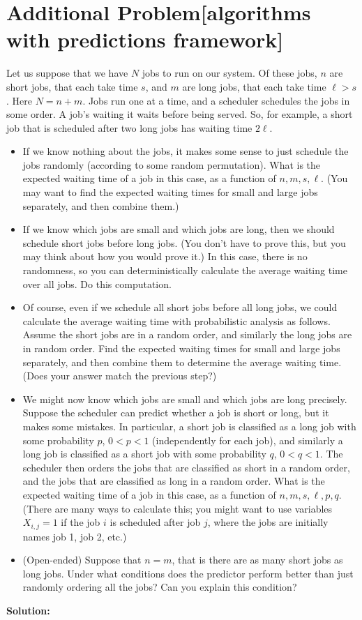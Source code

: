 \documentclass[11pt]{article}
\newenvironment{question}[2]
{\newpage\section{#1\texorpdfstring{\hfill}{horizontal spacing}{\rm\normalsize #2}}}{}
\newenvironment{solution}
{\textbf{Solution: }\color{blue}}
{\color{black}}
\begin{document}
\begin{question}{Additional Problem}{[algorithms with predictions framework]}

Let us suppose that we have \(N\) jobs to run on our system. Of these jobs, \(n\) are short jobs, that each take time \(s\), and \(m\) are long jobs, that each take time \(\ell > s\). Here \(N=n+m\). Jobs run one at a time, and a scheduler schedules the jobs in some order. A job's waiting it waits before being served. So, for example, a short job that is scheduled after two long jobs has waiting time \(2 \ell\).

\begin{itemize}
    \item If we know nothing about the jobs, it makes some sense to just schedule the jobs randomly (according to some random permutation). What is the expected waiting time of a job in this case, as a function of \(n,m,s,\ell\). (You may want to find the expected waiting times for small and large jobs separately, and then combine them.)
    \item If we know which jobs are small and which jobs are long, then we should schedule short jobs before long jobs. (You don't have to prove this, but you may think about how you would prove it.) In this case, there is no randomness, so you can deterministically calculate the average waiting time over all jobs. Do this computation.
    \item Of course, even if we schedule all short jobs before all long jobs, we could calculate the average waiting time with probabilistic analysis as follows. Assume the short jobs are in a random order, and similarly the long jobs are in random order. Find the expected waiting times for small and large jobs separately, and then combine them to determine the average waiting time. (Does your answer match the previous step?)
    \item We might now know which jobs are small and which jobs are long precisely. Suppose the scheduler can predict whether a job is short or long, but it makes some mistakes. In particular, a short job is classified as a long job with some probability \(p\), \(0<p<1\) (independently for each job), and similarly a long job is classified as a short job with some probability \(q\), \(0<q<1\). The scheduler then orders the jobs that are classified as short in a random order, and the jobs that are classified as long in a random order. What is the expected waiting time of a job in this case, as a function of \(n,m,s,\ell,p,q\). (There are many ways to calculate this; you might want to use variables \(X_{i,j}=1\) if the job \(i\) is scheduled after job \(j\), where the jobs are initially names job 1, job 2, etc.)
    \item (Open-ended) Suppose that \(n=m\), that is there are as many short jobs as long jobs. Under what conditions does the predictor perform better than just randomly ordering all the jobs? Can you explain this condition?
\end{itemize}

\begin{solution}

\end{solution}
\end{question}
\end{document}
